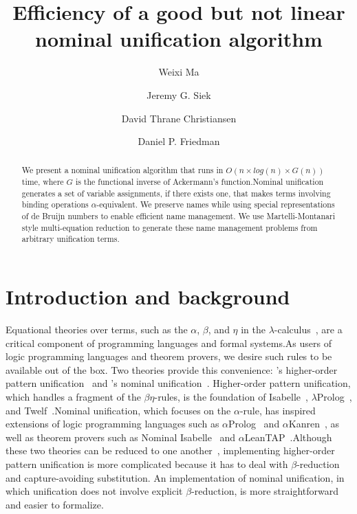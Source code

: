 \documentclass[a4paper,UKenglish]{lipics-v2016}
\title{Efficiency of a good but not linear nominal unification algorithm}
\author[1]{Weixi Ma}
\author[2]{Jeremy G. Siek}
\author[3]{David Thrane Christiansen}
\author[4]{Daniel P. Friedman}
\affil[1]{Indiana University,
\texttt{mvc@iu.edu}}
\affil[2]{Indiana University,
\texttt{jsiek@indiana.edu}}
\affil[3]{Galois, Inc.,
\texttt{dtc@galois.com}}
\affil[4]{Indiana University,
\texttt{dfried@indiana.edu}}
\begin{document}
\maketitle

\begin{abstract}
We present a nominal unification algorithm that runs in $O(n \times
log(n) \times G(n))$ time, where $G$ is the functional inverse of
Ackermann's function.Nominal unification generates a set of
variable assignments, if there exists one, that makes terms
involving binding operations $\alpha$-equivalent. We preserve names
while using special representations of de Bruijn numbers
to enable efficient name management.
We use Martelli-Montanari style multi-equation reduction
to generate these name management problems from arbitrary unification terms.
\end{abstract}

\section{Introduction and background}

Equational theories over terms, such as the $\alpha$, $\beta$, and $\eta$
in the $\lambda$-calculus~\citep{church_calculi_1941}, are
a critical component of
programming languages and formal systems.As users of logic
programming languages and theorem provers, we desire such rules to be
available out of the box. Two theories provide
this convenience: \citeauthor{miller_logic_1989}'s higher-order pattern unification~\citep{miller_logic_1989} and \citeauthor{urban_nominal_2004}'s nominal unification~\citep{urban_nominal_2004}. Higher-order pattern unification, which
handles a fragment of the $\beta\eta$-rules, is the foundation of
Isabelle~\citep{paulson_natural_1986},
$\lambda$Prolog~\citep{nadathur_overview_1988}, and
Twelf~\citep{pfenning_system_1999}.Nominal unification, which
focuses on the $\alpha$-rule, has inspired extensions of logic
programming languages such as $\alpha$Prolog~\citep{cheney_prolog:_2004}
and $\alpha$Kanren~\citep{byrd_kanren_2007}, as well as theorem
provers such as Nominal Isabelle~\citep{urban_nominal_2005} and
$\alpha$LeanTAP~\citep{near_leantap:_2008}.Although these two
theories can be reduced to one another~\citep{cheney_relating_2005,
levy_nominal_2012}, implementing higher-order pattern unification is
more complicated because it has to deal with $\beta$-reduction and
capture-avoiding substitution. An implementation of nominal unification,
in which unification does not involve explicit $\beta$-reduction,
is more straightforward and easier to formalize.
\end{document}
